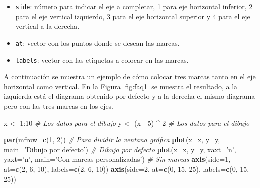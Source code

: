 \documentclass[10pt,]{krantz}
\makeatletter
\newenvironment{Shaded}{\begin{snugshade}}{\end{snugshade}}
\newcommand{\KeywordTok}[1]{\textcolor[rgb]{0.13,0.29,0.53}{\textbf{{#1}}}}
\newcommand{\DataTypeTok}[1]{\textcolor[rgb]{0.13,0.29,0.53}{{#1}}}
\newcommand{\DecValTok}[1]{\textcolor[rgb]{0.00,0.00,0.81}{{#1}}}
\newcommand{\StringTok}[1]{\textcolor[rgb]{0.31,0.60,0.02}{{#1}}}
\newcommand{\CommentTok}[1]{\textcolor[rgb]{0.56,0.35,0.01}{\textit{{#1}}}}
\newcommand{\NormalTok}[1]{{#1}}
\providecommand{\tightlist}{%
  \setlength{\itemsep}{0pt}\setlength{\parskip}{0pt}}
\newenvironment{kframe}{%
\medskip{}
\setlength{\fboxsep}{.8em}
 \def\at@end@of@kframe{}%
 \ifinner\ifhmode%
  \def\at@end@of@kframe{\end{minipage}}%
  \begin{minipage}{\columnwidth}%
 \fi\fi%
 \def\FrameCommand##1{\hskip\@totalleftmargin \hskip-\fboxsep
 \colorbox{shadecolor}{##1}\hskip-\fboxsep
     \hskip-\linewidth \hskip-\@totalleftmargin \hskip\columnwidth}%
 \MakeFramed {\advance\hsize-\width
   \@totalleftmargin\z@ \linewidth\hsize
   \@setminipage}}%
 {\par\unskip\endMakeFramed%
 \at@end@of@kframe}
\renewenvironment{Shaded}{\begin{kframe}}{\end{kframe}}
\makeatother
\begin{document}
\begin{itemize}
\tightlist
\item
  \texttt{side}: número para indicar el eje a completar, 1 para eje
  horizontal inferior, 2 para el eje vertical izquierdo, 3 para el eje
  horizontal superior y 4 para el eje vertical a la derecha.
\item
  \texttt{at}: vector con los puntos donde se desean las marcas.
\item
  \texttt{labels}: vector con las etiquetas a colocar en las marcas.
\end{itemize}

A continuación se muestra un ejemplo de cómo colocar tres marcas tanto
en el eje horizontal como vertical. En la Figura \ref{fig:faq1} se
muestra el resultado, a la izquierda está el diagrama obtenido por
defecto y a la derecha el mismo diagrama pero con las tres marcas en los
ejes.

\begin{Shaded}
\begin{Highlighting}[]
\NormalTok{x <-}\StringTok{ }\DecValTok{1}\NormalTok{:}\DecValTok{10}          \CommentTok{# Los datos para el dibujo}
\NormalTok{y <-}\StringTok{ }\NormalTok{(x -}\StringTok{ }\DecValTok{5}\NormalTok{) ^}\StringTok{ }\DecValTok{2}   \CommentTok{# Los datos para el dibujo}

\KeywordTok{par}\NormalTok{(}\DataTypeTok{mfrow=}\KeywordTok{c}\NormalTok{(}\DecValTok{1}\NormalTok{, }\DecValTok{2}\NormalTok{)) }\CommentTok{# Para dividir la ventana gráfica}
\KeywordTok{plot}\NormalTok{(}\DataTypeTok{x=}\NormalTok{x, }\DataTypeTok{y=}\NormalTok{y, }\DataTypeTok{main=}\StringTok{'Dibujo por defecto'}\NormalTok{)  }\CommentTok{# Dibujo por defecto}
\KeywordTok{plot}\NormalTok{(}\DataTypeTok{x=}\NormalTok{x, }\DataTypeTok{y=}\NormalTok{y, }\DataTypeTok{xaxt=}\StringTok{'n'}\NormalTok{, }\DataTypeTok{yaxt=}\StringTok{'n'}\NormalTok{,}
     \DataTypeTok{main=}\StringTok{'Con marcas personalizadas'}\NormalTok{)  }\CommentTok{# Sin marcas}
\KeywordTok{axis}\NormalTok{(}\DataTypeTok{side=}\DecValTok{1}\NormalTok{, }\DataTypeTok{at=}\KeywordTok{c}\NormalTok{(}\DecValTok{2}\NormalTok{, }\DecValTok{6}\NormalTok{, }\DecValTok{10}\NormalTok{), }\DataTypeTok{labels=}\KeywordTok{c}\NormalTok{(}\DecValTok{2}\NormalTok{, }\DecValTok{6}\NormalTok{, }\DecValTok{10}\NormalTok{))}
\KeywordTok{axis}\NormalTok{(}\DataTypeTok{side=}\DecValTok{2}\NormalTok{, }\DataTypeTok{at=}\KeywordTok{c}\NormalTok{(}\DecValTok{0}\NormalTok{, }\DecValTok{15}\NormalTok{, }\DecValTok{25}\NormalTok{), }\DataTypeTok{labels=}\KeywordTok{c}\NormalTok{(}\DecValTok{0}\NormalTok{, }\DecValTok{15}\NormalTok{, }\DecValTok{25}\NormalTok{))}
\end{Highlighting}
\end{Shaded}
\end{document}
